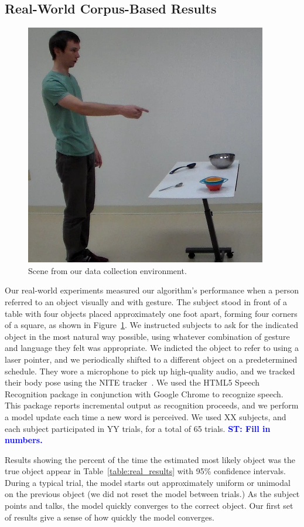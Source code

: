\documentclass[letterpaper, 10 pt, conference]{ieeeconf}
\newcommand{\stnote}[1]{\textcolor{Blue}{\textbf{ST: #1}}}
\begin{document}
\subsection{Real-World Corpus-Based Results}

\begin{figure}
\centering
\includegraphics[width=0.5\linewidth]{figures/dataset.png}
\caption{Scene from our data collection environment.\label{fig:corpus_scene}}
\end{figure}

Our real-world experiments measured our algorithm's performance when a
person referred to an object visually and with gesture.  The subject
stood in front of a table with four objects placed approximately one
foot apart, forming four corners of a square, as shown in
Figure~\ref{fig:corpus_scene}.  We instructed subjects to ask for the
indicated object in the most natural way possible, using whatever
combination of gesture and language they felt was appropriate. We
indicted the object to refer to using a laser pointer, and we
periodically shifted to a different object on a predetermined
schedule.  They wore a microphone to pick up high-quality audio, and
we tracked their body pose using the NITE tracker~\citep{openni}.  We
used the HTML5 Speech Recognition package in conjunction with Google
Chrome to recognize speech.  This package reports incremental output
as recognition proceeds, and we perform a model update each time a new
word is perceived.  We used XX subjects, and each subject participated
in YY trials, for a total of 65 trials. \stnote{Fill in numbers.}

Results showing the percent of the time the estimated most likely
object was the true object appear in Table~\ref{table:real_results}
with 95\% confidence intervals.  During a typical trial, the model
starts out approximately uniform or unimodal on the previous object
(we did not reset the model between trials.) As the subject points and
talks, the model quickly converges to the correct object.  Our first
set of results give a sense of how quickly the model converges.
\end{document}
